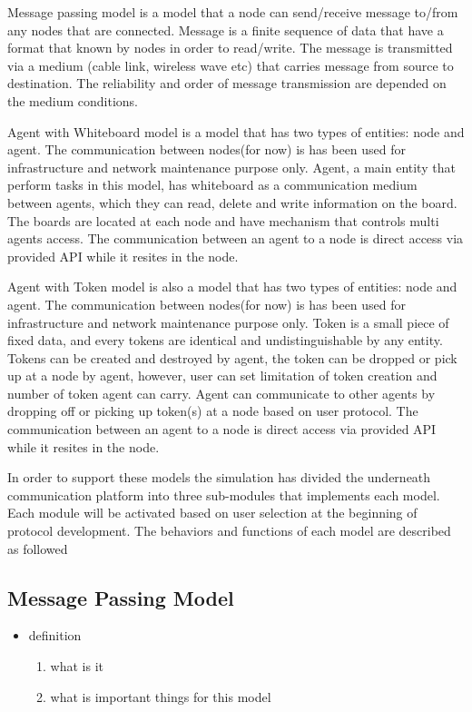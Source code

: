 Message passing model is a model that a node can send/receive message to/from any nodes that are connected. Message is a finite sequence of data that have a format that known by nodes in order to read/write. The message is transmitted via a medium (cable link, wireless wave etc) that carries message from source to destination. The reliability and order of message transmission are depended on the medium conditions.

Agent with Whiteboard model is a model that has two types of entities: node and agent. The communication between nodes(for now) is has been used for infrastructure and network maintenance purpose only. Agent, a main entity that perform tasks in this model, has whiteboard as a communication medium between agents, which they can read, delete and write information on the board. The boards are located at each node and have mechanism that controls multi agents access. The communication between an agent to a node is direct access via provided API while it resites in the node.

Agent with Token model is also a model that has two types of entities: node and agent. The communication between nodes(for now) is has been used for infrastructure and network maintenance purpose only. Token is a small piece of fixed data, and every tokens are identical and undistinguishable by any entity. Tokens can be created and destroyed by agent, the token can be dropped or pick up at a node by agent, however, user can set limitation of token creation and number of token agent can carry. Agent can communicate to other agents by dropping off or picking up token(s) at a node based on user protocol. The communication between an agent to a node is direct access via provided API while it resites in the node.

In order to support these models the simulation has divided the underneath communication platform into three sub-modules that implements each model. Each module will be activated based on user selection at the beginning of protocol development. The behaviors and functions of each model are described as followed

\subsection{Message Passing Model}
\begin{itemize}
\item definition
    \begin{enumerate}
    \item what is it
    \item what is important things for this model
    \end{enumerate}
\end{itemize}

